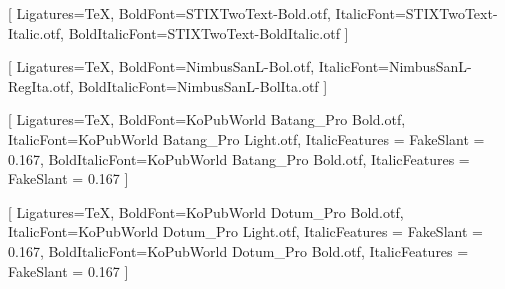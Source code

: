 
%


\usepackage{diagbox}                        %
\usepackage[utf8]{inputenc}
\usepackage{setspace}
\usepackage{tocloft}
\usepackage{makeidx}                        %
\usepackage{parskip}
\usepackage[hangul]{xetexko}
\usepackage{listings}                       %
\usepackage[framemethod=tikz]{mdframed}
\usepackage[unicode]{hyperref}
\usepackage{multirow}
\usepackage[many]{tcolorbox}
\usepackage{makecell}
\usepackage{environ}
\usepackage[tikz]{bclogo}
\usepackage{tikz}
\usepackage{lastpage}
\usepackage{fontawesome5}


\setmainfont[ExternalLocation=_extensions/bit2r/bitPublish/fonts/STIXTwoText/]{STIXTwoText-Regular.otf}[%
  Ligatures=TeX,
  BoldFont=STIXTwoText-Bold.otf,
  ItalicFont=STIXTwoText-Italic.otf,
  BoldItalicFont=STIXTwoText-BoldItalic.otf
]

\setsansfont[ExternalLocation=_extensions/bit2r/bitPublish/fonts/Nimbus Sans L/]{NimbusSanL-Reg.otf}[%
  Ligatures=TeX,
  BoldFont=NimbusSanL-Bol.otf,
  ItalicFont=NimbusSanL-RegIta.otf,
  BoldItalicFont=NimbusSanL-BolIta.otf
]

[%
  Ligatures=TeX,
  BoldFont=KoPubWorld Batang_Pro Bold.otf,
  ItalicFont=KoPubWorld Batang_Pro Light.otf,
  ItalicFeatures = {FakeSlant = 0.167},
  BoldItalicFont=KoPubWorld Batang_Pro Bold.otf,
  ItalicFeatures = {FakeSlant = 0.167}
]

[%
  Ligatures=TeX,
  BoldFont=KoPubWorld Dotum_Pro Bold.otf,
  ItalicFont=KoPubWorld Dotum_Pro Light.otf,
  ItalicFeatures = {FakeSlant = 0.167},
  BoldItalicFont=KoPubWorld Dotum_Pro Bold.otf,
  ItalicFeatures = {FakeSlant = 0.167}
]

